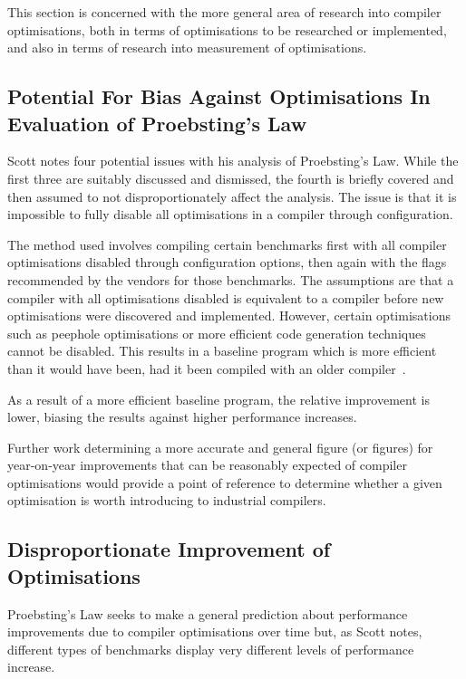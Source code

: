 This section is concerned with the more general area of research into compiler optimisations, both in terms of optimisations to be researched or implemented, and also in terms of research into measurement of optimisations.

\subsection{Potential For Bias Against Optimisations In Evaluation of Proebsting's Law}

Scott notes four potential issues with his analysis of Proebsting's Law. While the first three are suitably discussed and dismissed, the fourth is briefly covered and then assumed to not disproportionately affect the analysis. The issue is that it is impossible to fully disable all optimisations in a compiler through configuration.

The method used involves compiling certain benchmarks first with all compiler optimisations disabled through configuration options, then again with the flags recommended by the vendors for those benchmarks. The assumptions are that a compiler with all optimisations disabled is equivalent to a compiler before new optimisations were discovered and implemented. However, certain optimisations such as peephole optimisations or more efficient code generation techniques cannot be disabled. This results in a baseline program which is more efficient than it would have been, had it been compiled with an older compiler~\cite{proebstingformal}.

As a result of a more efficient baseline program, the relative improvement is lower, biasing the results against higher performance increases.

Further work determining a more accurate and general figure (or figures) for year-on-year improvements that can be reasonably expected of compiler optimisations would provide a point of reference to determine whether a given optimisation is worth introducing to industrial compilers.

\subsection{Disproportionate Improvement of Optimisations}

Proebsting's Law seeks to make a general prediction about performance improvements due to compiler optimisations over time but, as Scott notes, different types of benchmarks display very different levels of performance increase.

